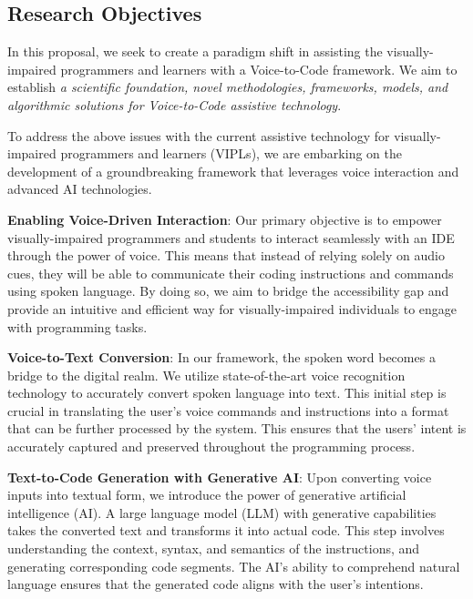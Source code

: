 \subsection{Research Objectives}


In this proposal, we seek to create a paradigm shift in assisting the
visually-impaired programmers and learners with a Voice-to-Code
framework. We aim to establish {\em a scientific foundation, novel
  methodologies, frameworks, models, and algorithmic solutions for
  Voice-to-Code assistive technology}.

To address the above issues with the current assistive technology for
visually-impaired programmers and learners (VIPLs), we are embarking
on the development of a groundbreaking framework that leverages voice
interaction and advanced AI technologies.

{\bf Enabling Voice-Driven Interaction}: Our primary objective is to
empower visually-impaired programmers and students to interact
seamlessly with an IDE through the power of voice. This means that
instead of relying solely on audio cues, they will be able to
communicate their coding instructions and commands using spoken
language. By doing so, we aim to bridge the accessibility gap and
provide an intuitive and efficient way for visually-impaired
individuals to engage with programming tasks.

{\bf Voice-to-Text Conversion}: In our framework, the spoken word
becomes a bridge to the digital realm. We utilize state-of-the-art
voice recognition technology to accurately convert spoken language
into text. This initial step is crucial in translating the user's
voice commands and instructions into a format that can be further
processed by the system. This ensures that the users' intent is
accurately captured and preserved throughout the programming process.

{\bf Text-to-Code Generation with Generative AI}: Upon converting
voice inputs into textual form, we introduce the power of generative
artificial intelligence (AI). A large language model (LLM) with
generative capabilities takes the converted text and transforms it
into actual code. This step involves understanding the context,
syntax, and semantics of the instructions, and generating
corresponding code segments. The AI's ability to comprehend natural
language ensures that the generated code aligns with the user's
intentions.


